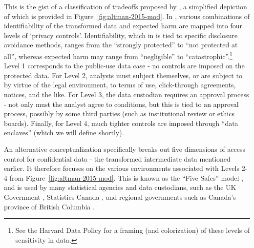This is the gist of a classification of tradeoffs proposed by \cite{altman_towards_2015},  a simplified depiction of which is provided in Figure~\ref{fig:altman-2015-mod}. In \cite{altman_towards_2015}, various combinations of identifiability of the transformed data and expected harm are mapped into four levels of `privacy controls'. Identifiability, which in \cite{altman_towards_2015} is tied to specific disclosure avoidance methods, ranges from the ``strongly protected'' to ``not protected at all'', whereas expected harm may range from ``negligible'' to ``catastrophic''.\footnote{See  the Harvard Data Policy  \cite{harvard_university_data_nodate} for a framing (and colorization) of these levels of sensitivity in data.}
  Level 1 corresponds to the public-use data case - no controls are imposed on the protected data. For Level 2, analysts must subject themselves, or are subject to by virtue of the legal environment, to terms of use, click-through agreements, notices, and the like. For Level 3, the data custodian requires an approval process - not only must the analyst agree to conditions, but this is tied to an approval process, possibly by some third parties (such as institutional review or ethics boards). Finally, for Level 4, much tighter controls are imposed through ``data enclaves'' (which we will define shortly). 

An alternative conceptualization specifically breaks out five dimensions of access control for confidential data - the transformed intermediate data mentioned earlier. It therefore focuses on the various environments associated with Levels 2-4 from Figure~\ref{fig:altman-2015-mod}. This is known as the ``Five Safes'' model \cite{desai_five_2016}, and is used by many statistical agencies and data custodians, such as the UK Government \cite{uk_government_digital_2020}, Statistics Canada \cite{statistics_canada_information_2018}, and regional governments such as Canada's province of British Columbia \cite{bc_ministry_of_citizens_services_privacy_nodate}.

